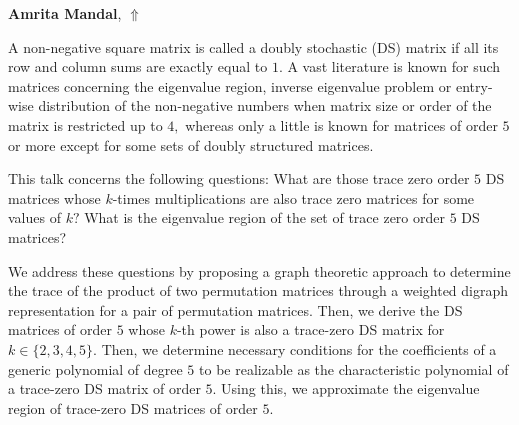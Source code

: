 \documentclass[ILAS2025-program.tex]{subfiles}
\begin{document}
\hypertarget{down0090}{}\begin{ilasabstract}
    
\textbf{Amrita Mandal},  \hfill \hyperlink{up0090}{$\Uparrow$}
    
    
\mtskip
     A non-negative square matrix is called a doubly stochastic (DS) matrix if all its row and column sums are exactly equal to $1.$ A vast literature is known for such matrices concerning the eigenvalue region, inverse eigenvalue problem or entry-wise distribution of the non-negative numbers when matrix size or order of the matrix is restricted up to $4,$
 whereas only a little is known for matrices of order $5$ or more except for some sets of doubly structured matrices. 
 
 This talk concerns the following questions: What are those trace zero order $5$ DS matrices whose $k$-times multiplications are also trace zero matrices for some values of $k?$ What is the eigenvalue region of the set of trace zero order $5$ DS matrices? 
 
 We address these questions by proposing a graph theoretic approach to determine the trace of the product of two permutation matrices through a weighted digraph representation for a pair of permutation matrices. Then, we derive the DS matrices of order $5$ whose $k$-th power is also a trace-zero DS matrix for $k\in\{2,3,4,5\}$. Then, we determine necessary conditions for the coefficients of a generic polynomial of degree $5$ to be realizable as the characteristic polynomial of a trace-zero DS matrix of order $5$. Using this, we approximate the eigenvalue region of trace-zero DS matrices of order $5.$ 
 
 
 
\end{ilasabstract}
    
\end{document}
